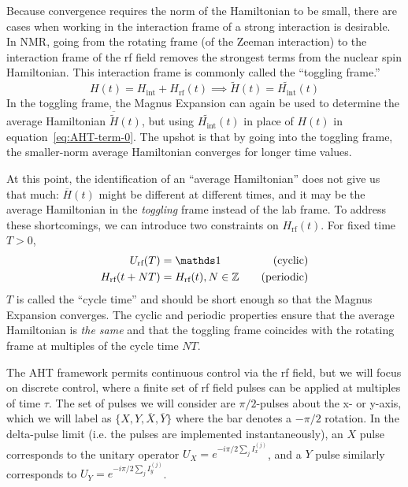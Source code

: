 Because convergence requires the norm of the Hamiltonian to be small, there are cases when working in the interaction frame of a strong interaction is desirable. In NMR, going from the rotating frame (of the Zeeman interaction) to the interaction frame of the rf field removes the strongest terms from the nuclear spin Hamiltonian. This interaction frame is commonly called the ``toggling frame.''
\[
H(t) = H_{\text{int}} + H_{\text{rf}}(t) \implies \widetilde{H}(t) = \widetilde{H_{\text{int}}}(t)
\]
In the toggling frame, the Magnus Expansion can again be used to determine the average Hamiltonian $\overline{\widetilde{H}}(t)$, but using $\widetilde{H_{\text{int}}}(t)$ in place of $H(t)$ in equation~\ref{eq:AHT-term-0}. The upshot is that by going into the toggling frame, the smaller-norm average Hamiltonian converges for longer time values.

At this point, the identification of an ``average Hamiltonian'' does not give us that much: $\overline{H}(t)$ might be different at different times, and it may be the average Hamiltonian in the \emph{toggling} frame instead of the lab frame. To address these shortcomings, we can introduce two constraints on $H_\text{rf}(t)$. For fixed time $T>0$,
\begin{align}\label{eq:AHT-constraints}
    U_{\text{rf}}(T) &= \identity & \quad \text{(cyclic)} \\
    H_{\text{rf}}(t + NT) &= H_{\text{rf}}(t), N \in \Z & \quad \text{(periodic)}
\end{align}
$T$ is called the ``cycle time'' and should be short enough so that the Magnus Expansion converges.
The cyclic and periodic properties ensure that the average Hamiltonian is \emph{the same} and that the toggling frame coincides with the rotating frame at multiples of the cycle time $NT$.

The AHT framework permits continuous control via the rf field, but we will focus on discrete control, where a finite set of rf field pulses can be applied at multiples of time $\tau$. The set of pulses we will consider are $\pi/2$-pulses about the x- or y-axis, which we will label as $\{ X, Y, \overline{X}, \overline{Y} \}$ where the bar denotes a $-\pi/2$ rotation. In the delta-pulse limit (i.e. the pulses are implemented instantaneously), an $X$ pulse corresponds to the unitary operator $U_X = e^{-i \pi/2 \sum_j I_x^{(j)}}$, and a $Y$ pulse similarly corresponds to $U_Y = e^{-i \pi/2 \sum_j I_y^{(j)}}$.

